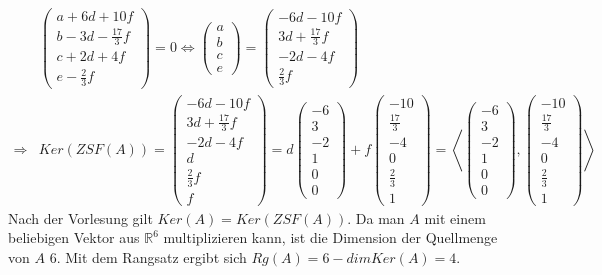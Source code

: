 \documentclass[a4paper,10pt]{article}
\begin{document}
\begin{align*}
 & \begin{pmatrix}
  a + 6d + 10f\\
  b - 3d - \frac{17}{3}f\\
  c + 2d + 4f\\
  e - \frac{2}{3}f
 \end{pmatrix} = 0
 \Leftrightarrow
 \begin{pmatrix}
  a\\
  b\\
  c\\
  e
 \end{pmatrix} =
 \begin{pmatrix}
  -6d - 10f\\
  3d + \frac{17}{3}f\\
  -2d - 4f\\
  \frac{2}{3}f
 \end{pmatrix}\\
 \Rightarrow & Ker(ZSF(A)) = 
  \begin{pmatrix}
   -6d - 10f\\
   3d + \frac{17}{3}f\\
   -2d - 4f\\
   d\\
   \frac{2}{3}f\\
   f
  \end{pmatrix} = 
  d\begin{pmatrix}
   -6\\
   3\\
   -2\\
   1\\
   0\\
   0
  \end{pmatrix} +
  f\begin{pmatrix}
   -10\\
   \frac{17}{3}\\
   -4\\
   0\\
   \frac{2}{3}\\
   1
  \end{pmatrix}
  = \left\langle
  \begin{pmatrix}
   -6\\
   3\\
   -2\\
   1\\
   0\\
   0
  \end{pmatrix},
  \begin{pmatrix}
   -10\\
   \frac{17}{3}\\
   -4\\
   0\\
   \frac{2}{3}\\
   1
  \end{pmatrix}
  \right\rangle
\end{align*}
Nach der Vorlesung gilt $Ker(A) = Ker(ZSF(A))$.
Da man $A$ mit einem beliebigen Vektor aus $\mathbb{R}^6$ multiplizieren kann, ist die Dimension der Quellmenge von $A$ $6$.
Mit dem Rangsatz ergibt sich $Rg(A) = 6 - dim Ker(A) = 4$.
\end{document}
